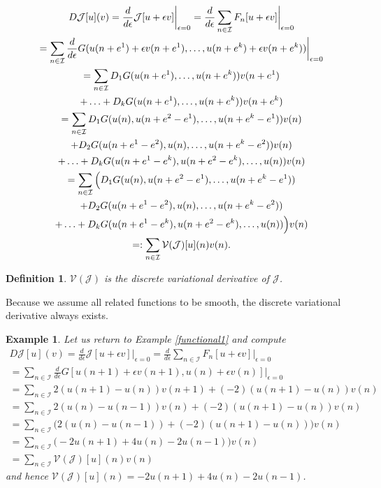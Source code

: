 \documentclass[manuscript]{acmart}
\newcommand{\1}{{\chi}}
\newcommand{\Ii}{{\mathcal{I}}}
\numberwithin{equation}{section}
\theoremstyle{thmlemcorr}
\numberwithin{theorem}{section}
\theoremstyle{thmlemcorr*}
\theoremstyle{defi}
\newtheorem{definition}[theorem]{Definition}
\theoremstyle{remexample}
\newtheorem{example}[theorem]{Example}
\theoremstyle{ass}
\begin{document}
	\begin{gather}
	\notag	D\mathcal{J}[u](v)=\frac{d}{d\epsilon}\mathcal{J}[u+\epsilon v]\bigg|_{\epsilon=0}=\frac{d}{d\epsilon}\sum_{n\in\Ii}F_n[u+\epsilon v]\bigg|_{\epsilon=0}\\
	\notag	=\sum_{n\in\Ii}\frac{d}{d\epsilon}G(u(n+e^1)+\epsilon v(n+e^1),\ldots,u(n+e^k)+\epsilon v(n+e^k))\bigg|_{\epsilon=0}\\
	\notag	=\sum_{n\in\Ii}D_1G(u(n+e^1),\ldots,u(n+e^k))v(n+e^1)\\
	\notag	+\ldots+D_kG(u(n+e^1),\ldots,u(n+e^k))v(n+e^k)\\
	\label{periodicity}	=\sum_{n\in\Ii}D_1G(u(n),u(n+e^2-e^1),\ldots,u(n+e^k-e^1))v(n)\\
	\notag	+D_2G(u(n+e^1-e^2),u(n),\ldots,u(n+e^k-e^2))v(n)\\
	\notag	+\ldots+D_kG(u(n+e^1-e^k),u(n+e^2-e^k),\ldots,u(n))v(n)\\
	\notag	=\sum_{n\in\Ii}\Big(D_1G(u(n),u(n+e^2-e^1),\ldots,u(n+e^k-e^1))\\
	\notag	+D_2G(u(n+e^1-e^2),u(n),\ldots,u(n+e^k-e^2))\\
	\notag	+\ldots+D_kG(u(n+e^1-e^k),u(n+e^2-e^k),\ldots,u(n))\Big)v(n)\\
	\notag	=:\sum_{n\in\Ii}\mathcal{V}(\mathcal{J})[u](n)v(n).	
	\end{gather}
\begin{definition}
$\mathcal{V}(\mathcal{J})$ is the \emph{discrete variational derivative} of $\mathcal{J}$.
\end{definition}
Because we assume all related functions to be smooth, the discrete variational derivative always exists.
\begin{example}
	Let us return to Example \ref{functional1} and compute
	\begin{gather*}
		D\mathcal{J}[u](v)=\frac{d}{d\epsilon}\mathcal{J}[u+\epsilon v]\bigg|_{\epsilon=0}=\frac{d}{d\epsilon}\sum_{n\in\Ii}F_n[u+\epsilon v]\bigg|_{\epsilon=0}\\
		=\sum_{n\in\Ii}\frac{d}{d\epsilon}G[u(n+1)+\epsilon v(n+1),u(n)+\epsilon v(n)]\bigg|_{\epsilon=0}\\
		=\sum_{n\in\Ii}2(u(n+1)-u(n))v(n+1)+(-2)(u(n+1)-u(n))v(n)\\
		=\sum_{n\in\Ii}2(u(n)-u(n-1))v(n)+(-2)(u(n+1)-u(n))v(n)\\
		=\sum_{n\in\Ii}\Big(2(u(n)-u(n-1))+(-2)(u(n+1)-u(n))\Big)v(n)\\
		=\sum_{n\in\Ii}\Big(-2u(n+1)+4u(n)-2u(n-1)\Big)v(n)\\
		=\sum_{n\in\Ii}\mathcal{V}(\mathcal{J})[u](n)v(n)
	\end{gather*}
	and hence $\mathcal{V}(\mathcal{J})[u](n)=-2u(n+1)+4u(n)-2u(n-1)$.
\end{example}
\end{document}
